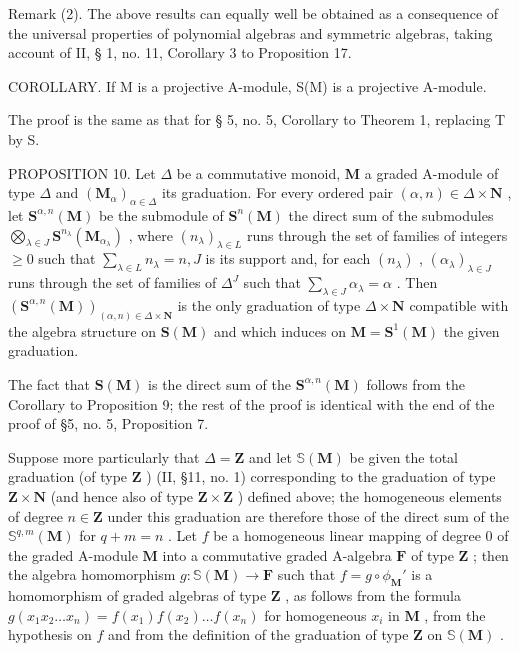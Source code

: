 Remark (2). The above results can equally well be obtained as a consequence of the universal properties of polynomial algebras and symmetric algebras, taking account of II, § 1, no. 11, Corollary 3 to Proposition 17.

COROLLARY. If M is a projective A-module, S(M) is a projective A-module.

The proof is the same as that for § 5, no. 5, Corollary to Theorem 1, replacing T by S.

PROPOSITION 10. Let \(\Delta\) be a commutative monoid, \(\mathbf{M}\) a graded A-module of type \(\Delta\) and \((\mathbf{M}_{\alpha})_{\alpha \in \Delta}\) its graduation. For every ordered pair \((\alpha, n) \in \Delta \times \mathbf{N}\) , let \(\mathbf{S}^{\alpha, n}(\mathbf{M})\) be the submodule of \(\mathbf{S}^n(\mathbf{M})\) the direct sum of the submodules \(\bigotimes_{\lambda \in J} \mathbf{S}^{n_{\lambda}}(\mathbf{M}_{\alpha_{\lambda}})\) , where \((n_{\lambda})_{\lambda \in L}\) runs through the set of families of integers \(\geqslant 0\) such that \(\sum_{\lambda \in L} n_{\lambda} = n, J\) is its support and, for each \((n_{\lambda})\) , \((\alpha_{\lambda})_{\lambda \in J}\) runs through the set of families of \(\Delta^J\) such that \(\sum_{\lambda \in J} \alpha_{\lambda} = \alpha\) . Then \((\mathbf{S}^{\alpha, n}(\mathbf{M}))_{(\alpha, n) \in \Delta \times \mathbf{N}}\) is the only graduation of type \(\Delta \times \mathbf{N}\) compatible with the algebra structure on \(\mathbf{S}(\mathbf{M})\) and which induces on \(\mathbf{M} = \mathbf{S}^1(\mathbf{M})\) the given graduation.

The fact that \(\mathbf{S}(\mathbf{M})\) is the direct sum of the \(\mathbf{S}^{\alpha,n}(\mathbf{M})\) follows from the Corollary to Proposition 9; the rest of the proof is identical with the end of the proof of §5, no. 5, Proposition 7.

Suppose more particularly that \(\Delta = \mathbf{Z}\) and let \(\mathbb{S}(\mathbf{M})\) be given the total graduation (of type \(\mathbf{Z}\) ) (II, §11, no. 1) corresponding to the graduation of type \(\mathbf{Z} \times \mathbf{N}\) (and hence also of type \(\mathbf{Z} \times \mathbf{Z}\) ) defined above; the homogeneous elements of degree \(n \in \mathbf{Z}\) under this graduation are therefore those of the direct sum of the \(\mathbb{S}^{q, m}(\mathbf{M})\) for \(q + m = n\) . Let \(f\) be a homogeneous linear mapping of degree 0 of the graded A-module \(\mathbf{M}\) into a commutative graded A-algebra \(\mathbf{F}\) of type \(\mathbf{Z}\) ; then the algebra homomorphism \(g: \mathbb{S}(\mathbf{M}) \to \mathbf{F}\) such that \(f = g \circ \phi_{\mathbf{M}}'\) is a homomorphism of graded algebras of type \(\mathbf{Z}\) , as follows from the formula \(g(x_1 x_2 \ldots x_n) = f(x_1) f(x_2) \ldots f(x_n)\) for homogeneous \(x_i\) in \(\mathbf{M}\) , from the hypothesis on \(f\) and from the definition of the graduation of type \(\mathbf{Z}\) on \(\mathbb{S}(\mathbf{M})\) .

